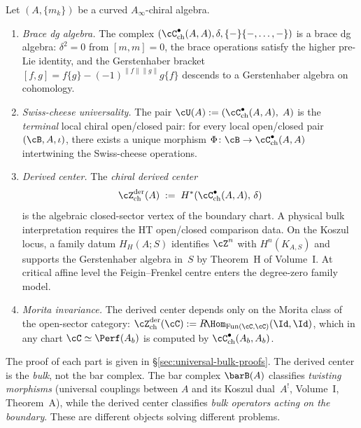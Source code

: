 \begin{theorem}
\label{thm:universal-bulk}
Let $(A, \{m_k\})$ be a curved $A_\infty$-chiral algebra.
\begin{enumerate}[label=\textup{(\roman*)}]
\item \emph{Brace dg algebra.} The complex
 $(\cC^\bullet_{\mathrm{ch}}(A, A), \delta, \{-\}\{-,\ldots,-\})$
 is a brace dg algebra: $\delta^2 = 0$ from $[m,m] = 0$, the
 brace operations satisfy the higher pre-Lie identity, and the
 Gerstenhaber bracket $[f,g] = f\{g\} - (-1)^{\|f\|\|g\|} g\{f\}$
 descends to a Gerstenhaber algebra on cohomology.

\item \emph{Swiss-cheese universality.}
 The pair $\cU(A) := (\cC^\bullet_{\mathrm{ch}}(A, A),\; A)$
 is the \emph{terminal} local chiral open/closed pair: for every
 local open/closed pair $(\cB, A, \iota)$, there exists a unique
 morphism $\Phi \colon \cB \to \cC^\bullet_{\mathrm{ch}}(A,A)$
 intertwining the Swiss-cheese operations.

\item \emph{Derived center.} The \emph{chiral derived center}
 \[
 \cZ^{\mathrm{der}}_{\mathrm{ch}}(A)
 \;:=\;
 H^*(\cC^\bullet_{\mathrm{ch}}(A, A),\, \delta)
 \]
 is the algebraic closed-sector vertex of the boundary chart. A
 physical bulk interpretation requires the HT open/closed comparison
 data. On the Koszul locus, a family datum $H_H(A;S)$ identifies
 $\cZ^n$ with $H^n(K_{A,S})$ and supports the Gerstenhaber algebra
 in~$S$ by Theorem~H of Volume~I.  At critical affine level the
 Feigin--Frenkel centre enters the degree-zero family model.

\item \emph{Morita invariance.}
 The derived center depends only on the Morita class of the
 open-sector category:
 $\cZ^{\mathrm{der}}_{\mathrm{ch}}(\cC)
 := R\!\Hom_{\operatorname{Fun}(\cC,\cC)}(\Id, \Id)$,
 which in any chart $\cC \simeq \Perf(A_b)$ is computed by
 $\cC^\bullet_{\mathrm{ch}}(A_b, A_b)$.
\end{enumerate}
\end{theorem}

The proof of each part is given in
\S\ref{sec:universal-bulk-proofs}. The
derived center is the \emph{bulk}, not the bar complex.
The bar complex $\barB(A)$ classifies \emph{twisting morphisms}
(universal couplings between $A$ and its Koszul dual~$A^!$,
Volume~I, Theorem~A), while the derived center classifies
\emph{bulk operators acting on the boundary}. These are different
objects solving different problems.

